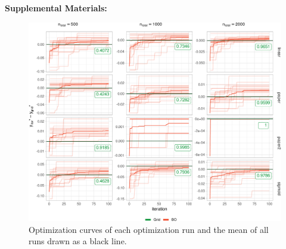 \documentclass[bimj,fleqn]{w-art}
\theoremstyle{plain}
\theoremstyle{definition}
\begin{document}








\clearpage
\begin{center}
\textbf{\large Supplemental Materials: \newtitle}
\end{center}
\FloatBarrier
\setcounter{equation}{0}
\setcounter{figure}{0}
\setcounter{table}{0}
\setcounter{page}{1}
\makeatletter
\renewcommand{\theequation}{S\arabic{equation}}
\renewcommand{\thefigure}{S\arabic{figure}}
\renewcommand{\thetable}{S\arabic{table}}
\renewcommand{\bibnumfmt}[1]{[S#1]}



\begin{figure}[htb]
\centering
\includegraphics[width=\linewidth]{generated/figures/plot_opt_path.pdf}
\caption{%
 Optimization curves of each optimization run and the mean of all runs drawn as a black line.
}
\label{fig:plot_opt_path} 
\end{figure}
\end{document}
